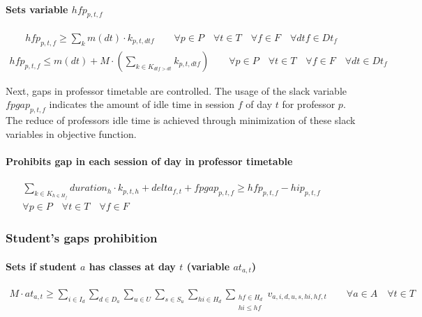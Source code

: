 \paragraph{Sets variable $hfp_{p,t,f}$}
\begin{eqnarray}
hfp_{p,t,f} \geq \sum\limits_{k} m(dt) \cdot k_{p,t,dtf} \nonumber \qquad
\forall p \in P \quad
\forall t \in T \quad
\forall f \in F \quad
\forall dtf \in Dt_{f}
\end{eqnarray}
\begin{eqnarray}
hfp_{p,t,f} \leq m(dt) + M \cdot ( \sum\limits_{k \in K_{dtf>dt}} k_{p,t,dtf} ) \nonumber \qquad
\forall p \in P \quad
\forall t \in T \quad
\forall f \in F \quad
\forall dt \in Dt_{f}
\end{eqnarray}

Next, gaps in professor timetable are controlled. The usage of the slack variable $fpgap_{p,t,f}$ indicates the amount of idle time in session $f$ of day $t$ for professor $p$. The reduce of professors idle time is achieved through minimization of these slack variables in objective function.

\paragraph{Prohibits gap in each session of day in professor timetable}
\begin{eqnarray}
\sum\limits_{k \in K_{h \in H_{f}}} duration_{h} \cdot k_{p,t,h} + delta_{f,t} + fpgap_{p,t,f} \geq hfp_{p,t,f} - hip_{p,t,f} \nonumber \qquad
\\
\forall p \in P \quad
\forall t \in T \quad
\forall f \in F \quad
\end{eqnarray}


\subsubsection{Student's gaps prohibition}
\label{constrStudentGap}

\paragraph{Sets if student $a$ has classes at day $t$ (variable $at_{a,t}$)}
\begin{eqnarray}
M \cdot at_{a,t} \ge \sum\limits_{i \in I_{d}} \sum\limits_{d \in D_{a}} \sum\limits_{u \in U} \sum\limits_{s \in S_{u}} \sum\limits_{hi \in H_{d}} \sum_{\substack {hf \in H_{d} \\ hi\le hf}} v_{a,i,d,u,s,hi,hf,t} \nonumber \qquad 
\forall a \in A \quad
\forall t \in T
\end{eqnarray}

